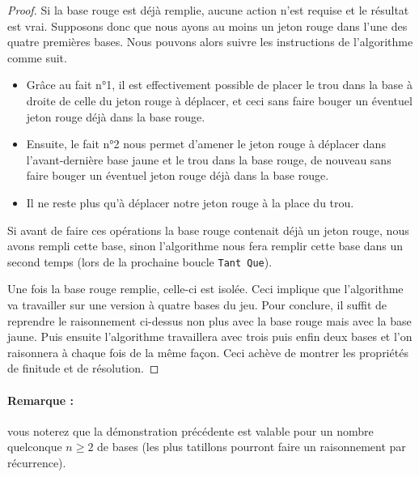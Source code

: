 \begin{proof}
	Si la base rouge est déjà remplie, aucune action n'est requise et le résultat est vrai.
	Supposons donc que nous ayons au moins un jeton rouge dans l'une des quatre premières bases. Nous pouvons alors suivre les instructions de l'algorithme comme suit.


	\medskip

	\begin{itemize}
		\item[\textbullet] Grâce au fait n°1, il est effectivement possible de placer le trou dans la base à droite de celle du jeton rouge à déplacer, et ceci sans faire bouger un éventuel jeton rouge déjà dans la base rouge.

		\medskip

		\item[\textbullet] Ensuite, le fait n°2 nous permet d'amener le jeton rouge à déplacer dans l'avant-dernière base jaune et le trou dans la base rouge, de nouveau sans faire bouger un éventuel jeton rouge déjà dans la base rouge.

		\medskip

		\item[\textbullet] Il ne reste plus qu'à déplacer notre jeton rouge à la place du trou.
	\end{itemize}


	\medskip

	Si avant de faire ces opérations la base rouge contenait déjà un jeton rouge, nous avons rempli cette base, sinon l'algorithme nous fera remplir cette base dans un second temps (lors de la prochaine boucle \verb+Tant Que+).


	\medskip

	Une fois la base rouge remplie, celle-ci est isolée. Ceci implique que l'algorithme va travailler sur une version à quatre bases du jeu. Pour conclure, il suffit de reprendre le raisonnement ci-dessus non plus avec la base rouge mais avec la base jaune. Puis ensuite l'algorithme travaillera avec trois puis enfin deux bases et l'on raisonnera à chaque fois de la même façon. Ceci achève de montrer les propriétés de finitude et de résolution.

\end{proof}


\paragraph{Remarque :} \hspace{-1em} vous noterez que la démonstration précédente est valable pour un nombre quelconque $n \geqslant 2$ de bases (les plus tatillons pourront faire un raisonnement par récurrence).
